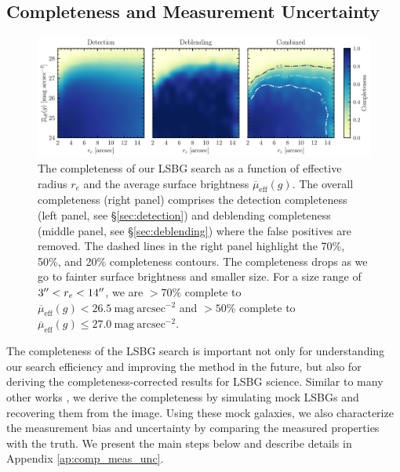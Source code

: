 \documentclass[twocolumn,astrosymb,twocolappendix]{aastex631}
\newcommand{\sbunit}{\mathrm{mag\ arcsec}^{-2}}
\newcommand{\sbeff}{\overline{\mu}_{\mathrm{eff}}(g)}
\begin{document}
\begin{CJK*}{UTF8}{gbsn}
\subsection{Completeness and Measurement Uncertainty}\label{sec:comp_meas}
\begin{figure}
	\vbox{ 
		\centering
		\includegraphics[width=1\linewidth]{completeness.pdf}
	}
	\caption{The completeness of our LSBG search as a function of effective radius $r_e$ and the average surface brightness $\sbeff$. The overall completeness (right panel) comprises the detection completeness (left panel, see \S \ref{sec:detection}) and deblending completeness (middle panel, see \S \ref{sec:deblending}) where the false positives are removed. The dashed lines in the right panel highlight the 70\%, 50\%, and 20\% completeness contours. The completeness drops as we go to fainter surface brightness and smaller size. For a size range of $3\mbox{$^{\prime\prime}$} < r_e < 14\mbox{$^{\prime\prime}$}$, we are $>70\%$ complete to $\sbeff < 26.5\ \sbunit$ and $>50\%$ complete to $\sbeff \leqslant 27.0\ \sbunit$. 
	}
	\label{fig:completeness}
\end{figure}

The completeness of the LSBG search is important not only for understanding our search efficiency and improving the method in the future, but also for deriving the completeness-corrected results for LSBG science. Similar to many other works \citep[e.g.,][]{vdBurg2017,Zaritsky2021,CarlstenELVES2022,Greene2022}, we derive the completeness by simulating mock LSBGs and recovering them from the image. Using these mock galaxies, we also characterize the measurement bias and uncertainty by comparing the measured properties with the truth. We present the main steps below and describe details in Appendix \ref{ap:comp_meas_unc}.


\end{CJK*}
\end{document}
